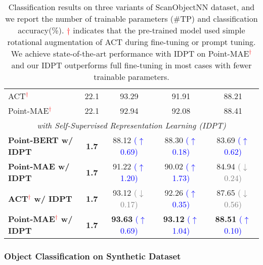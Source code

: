 \documentclass[10pt,twocolumn,letterpaper]{article}
\begin{document}
\begin{table}[t]
{\begin{tabular}{lcccc}
    ACT\textcolor{red}{$^\dagger$} \cite{dong2022autoencoders}   & 22.1  & 93.29 & 91.91  & 88.21 \\
    Point-MAE\textcolor{red}{$^\dagger$} \cite{pang2022masked}  & 22.1  & 92.94 & 92.08 & 88.41 \\ 
    \midrule
    \multicolumn{5}{c}{\textit{with Self-Supervised Representation Learning (IDPT)}} \\
    \midrule
    \rowcolor{mycolor} \textbf{Point-BERT w/ IDPT} & \textbf{1.7} &  88.12 \textcolor{blue}{($\uparrow$ 0.69)}   & 88.30 \textcolor{blue}{($\uparrow$ 0.18)}      & 83.69 \textcolor{blue}{($\uparrow$ 0.62)} \\
    \rowcolor{mycolor} \textbf{Point-MAE w/ IDPT} & \textbf{1.7} & 91.22 \textcolor{blue}{($\uparrow$ 1.20)} & 90.02 \textcolor{blue}{($\uparrow$ 1.73)} & 84.94 \textcolor{gray}{($\downarrow$ 0.24)} \\
    \rowcolor{mycolor} \textbf{ACT\textcolor{red}{$^\dagger$} w/ IDPT} & \textbf{1.7}  & 93.12 \textcolor{gray}{($\downarrow$ 0.17)} & 92.26 \textcolor{blue}{($\uparrow$ 0.35)} & 87.65 \textcolor{gray}{($\downarrow$ 0.56)} \\ 
    \rowcolor{mycolor} \textbf{Point-MAE\textcolor{red}{$^\dagger$} w/ IDPT} & \textbf{1.7} & \textbf{93.63} \textcolor{blue}{($\uparrow$ 0.69)} & \textbf{93.12} \textcolor{blue}{($\uparrow$ 1.04)} & \textbf{88.51} \textcolor{blue}{($\uparrow$ 0.10)} \\ 
    \bottomrule
    \end{tabular}}
  \caption{Classification results on three variants of ScanObjectNN dataset, and we report the number of trainable parameters (\#TP) and classification accuracy(\%). \textcolor{red}{$\dagger$} indicates that the pre-trained model used simple rotational augmentation of ACT \cite{dong2022autoencoders} during fine-tuning or prompt tuning. We achieve state-of-the-art performance with IDPT on Point-MAE\textcolor{red}{$^\dagger$} and our IDPT outperforms full fine-tuning in most cases with fewer trainable parameters.}
  \label{table1}\end{table}

\subsubsection{Object Classification on Synthetic Dataset} 
\end{document}
